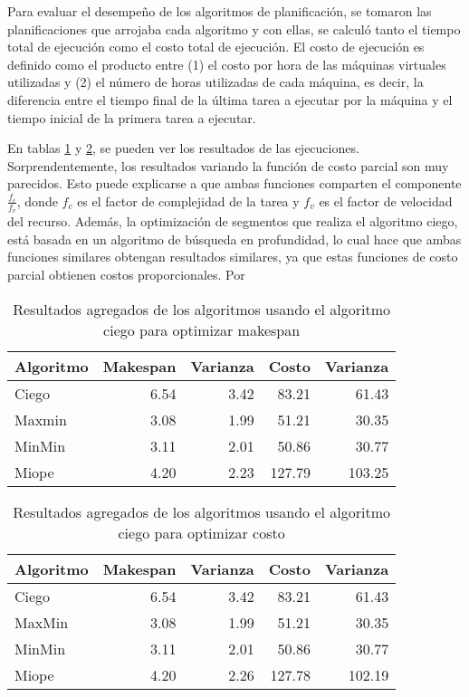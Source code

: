 Para evaluar el desempeño de los algoritmos de planificación, se tomaron las planificaciones que arrojaba cada algoritmo y con ellas, se calculó tanto el tiempo total de ejecuci\'on como el costo total de ejecución. El costo de ejecución es definido como el producto entre (1) el costo por hora de las máquinas virtuales utilizadas y (2) el número de horas utilizadas de cada máquina, es decir, la diferencia entre el tiempo final de la última tarea a ejecutar por la máquina y el tiempo inicial de la primera tarea a ejecutar.

En tablas \ref{table:results_makespan} y \ref{table:results_cost}, se pueden ver los resultados de las ejecuciones. Sorprendentemente, los resultados variando la funci\'on de costo parcial son muy parecidos. Esto puede explicarse a que ambas funciones comparten el componente $\frac{f_c}{f_v}$, donde $f_c$ es el factor de complejidad de la tarea y $f_v$ es el factor de velocidad del recurso. Además, la optimización de segmentos que realiza el algoritmo ciego, está basada en un algoritmo de búsqueda en profundidad, lo cual hace que ambas funciones similares obtengan resultados similares, ya que estas funciones de costo parcial obtienen costos proporcionales. Por


\begin{table}[ht]
\centering
\begin{tabular}{lrrrr}
  \hline
Algoritmo & Makespan & Varianza & Costo & Varianza \\ 
  \hline
  Ciego & 6.54 & 3.42 & 83.21 & 61.43 \\ 
  Maxmin & 3.08 & 1.99 & 51.21 & 30.35 \\ 
  MinMin & 3.11 & 2.01 & 50.86 & 30.77 \\ 
  Miope & 4.20 & 2.23 & 127.79 & 103.25 \\ 
  \hline
\end{tabular}
\caption{Resultados agregados de los algoritmos usando el algoritmo ciego para optimizar makespan} 
\label{table:results_makespan}
\end{table}


\begin{table}[ht]
\centering
\begin{tabular}{lrrrr}
  \hline
Algoritmo & Makespan & Varianza & Costo & Varianza \\ 
  \hline
  Ciego & 6.54 & 3.42 & 83.21 & 61.43 \\ 
  MaxMin & 3.08 & 1.99 & 51.21 & 30.35 \\ 
  MinMin & 3.11 & 2.01 & 50.86 & 30.77 \\ 
  Miope & 4.20 & 2.26 & 127.78 & 102.19 \\ 
  \hline
\end{tabular}
\caption{Resultados agregados de los algoritmos usando el algoritmo ciego para optimizar costo} 
\label{table:results_cost}
\end{table}


